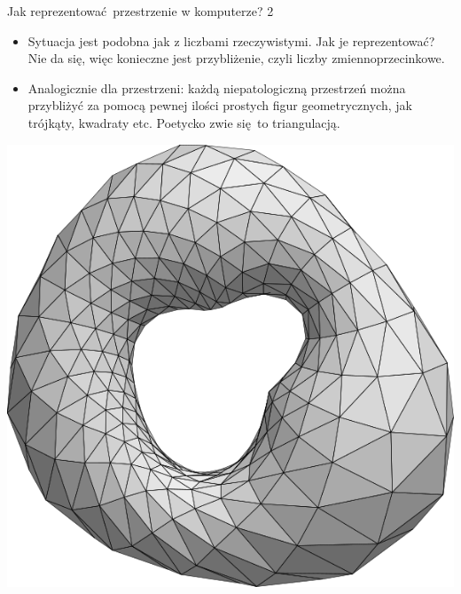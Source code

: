 \documentclass{beamer}
\begin{document}
\begin{frame}{Jak reprezentować przestrzenie w komputerze? 2}
\begin{itemize}
	\item Sytuacja jest podobna jak z liczbami rzeczywistymi. Jak je reprezentować? Nie da się, więc konieczne jest przybliżenie, czyli liczby zmiennoprzecinkowe.
	\item Analogicznie dla przestrzeni: każdą niepatologiczną przestrzeń można przybliżyć za pomocą pewnej ilości prostych figur geometrycznych, jak trójkąty, kwadraty etc. Poetycko zwie się to triangulacją.
\end{itemize}

\begin{center}
\includegraphics[scale = 0.2]{TriangulacjaTorusa.png}
\end{center}

\end{frame}
\end{document}

